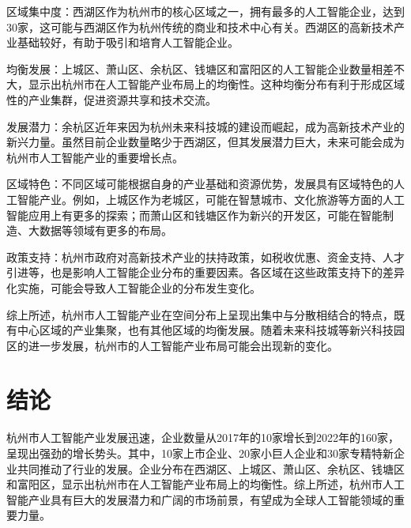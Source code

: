 \documentclass[UTF8,twocolumn]{ctexart}
\begin{document}
区域集中度：西湖区作为杭州市的核心区域之一，拥有最多的人工智能企业，达到30家，这可能与西湖区作为杭州传统的商业和技术中心有关。西湖区的高新技术产业基础较好，有助于吸引和培育人工智能企业。

均衡发展：上城区、萧山区、余杭区、钱塘区和富阳区的人工智能企业数量相差不大，显示出杭州市在人工智能产业布局上的均衡性。这种均衡分布有利于形成区域性的产业集群，促进资源共享和技术交流。

发展潜力：余杭区近年来因为杭州未来科技城的建设而崛起，成为高新技术产业的新兴力量。虽然目前企业数量略少于西湖区，但其发展潜力巨大，未来可能会成为杭州市人工智能产业的重要增长点。

区域特色：不同区域可能根据自身的产业基础和资源优势，发展具有区域特色的人工智能产业。例如，上城区作为老城区，可能在智慧城市、文化旅游等方面的人工智能应用上有更多的探索；而萧山区和钱塘区作为新兴的开发区，可能在智能制造、大数据等领域有更多的布局。

政策支持：杭州市政府对高新技术产业的扶持政策，如税收优惠、资金支持、人才引进等，也是影响人工智能企业分布的重要因素。各区域在这些政策支持下的差异化实施，可能会导致人工智能企业的分布发生变化。

综上所述，杭州市人工智能产业在空间分布上呈现出集中与分散相结合的特点，既有中心区域的产业集聚，也有其他区域的均衡发展。随着未来科技城等新兴科技园区的进一步发展，杭州市的人工智能产业布局可能会出现新的变化。

\section{结论}
杭州市人工智能产业发展迅速，企业数量从2017年的10家增长到2022年的160家，呈现出强劲的增长势头。其中，10家上市企业、20家小巨人企业和30家专精特新企业共同推动了行业的发展。企业分布在西湖区、上城区、萧山区、余杭区、钱塘区和富阳区，显示出杭州市在人工智能产业布局上的均衡性。综上所述，杭州市人工智能产业具有巨大的发展潜力和广阔的市场前景，有望成为全球人工智能领域的重要力量。
\end{document}
